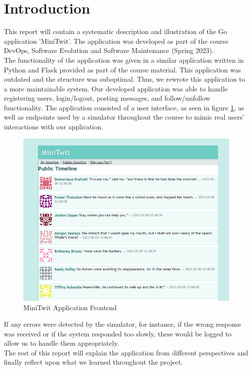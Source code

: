 \section{Introduction}
This report will contain a systematic description and illustration of the Go application 
'MiniTwit'. The application was developed as part of the course 
DevOps, Software Evolution and Software Maintenance (Spring 2023). \\

The functionality of the application was
given in a similar application written in Python and Flask provided as part of the course material. This
application was outdated and the structure was suboptimal. Thus, we rewrote this application to a more 
maintainable system. Our developed application was able to handle registering users, login/logout, 
posting messages, and follow/unfollow functionality. The application consisted of a user interface, 
as seen in figure \ref{fig:minitwit_app}, as well as endpoints used by a simulator throughout the course to 
mimic real users' interactions with our application.

\begin{figure}[H]
    \centering
    \captionsetup{justification=centering,margin=1cm}
    \includegraphics[width=0.8\linewidth]{report/images/minitwit.png}
    \caption{MiniTwit Application Frontend}
    \label{fig:minitwit_app}
\end{figure}

If any errors were detected by the simulator, for instance, if the wrong response was received or if the system
responded too slowly, these would be logged to allow us to handle them appropriately.\\

The rest of this report will explain the application from different perspectives and finally reflect upon
what we learned throughout the project.


